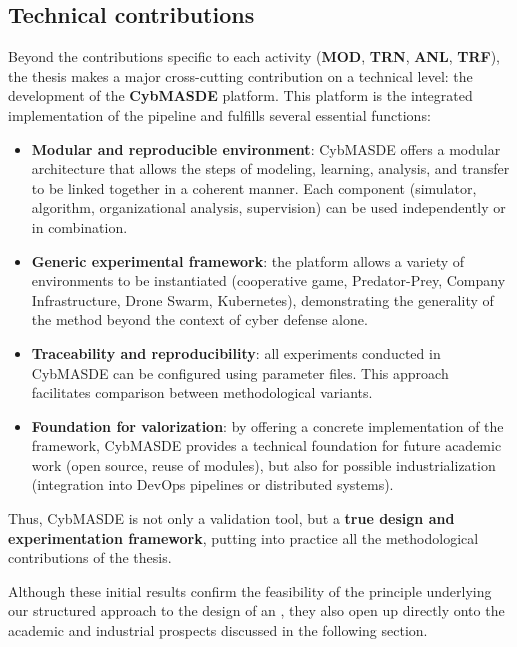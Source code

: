         \subsection*{Technical contributions}
        Beyond the contributions specific to each activity (\textbf{MOD}, \textbf{TRN}, \textbf{ANL}, \textbf{TRF}), the thesis makes a major cross-cutting contribution on a technical level: the development of the \textbf{CybMASDE} platform.
        This platform is the integrated implementation of the  pipeline and fulfills several essential functions:
        \begin{itemize}
          \item \textbf{Modular and reproducible environment}: CybMASDE offers a modular architecture that allows the steps of modeling, learning, analysis, and transfer to be linked together in a coherent manner. Each component (simulator,  algorithm, organizational analysis, supervision) can be used independently or in combination.
          \item \textbf{Generic experimental framework}: the platform allows a variety of environments to be instantiated (cooperative game, Predator-Prey, Company Infrastructure, Drone Swarm, Kubernetes), demonstrating the generality of the method beyond the context of cyber defense alone.
          \item \textbf{Traceability and reproducibility}: all experiments conducted in CybMASDE can be configured using parameter files. This approach facilitates comparison between methodological variants.

          \item \textbf{Foundation for valorization}: by offering a concrete implementation of the  framework, CybMASDE provides a technical foundation for future academic work (open source, reuse of modules), but also for possible industrialization (integration into DevOps pipelines or distributed systems).
        \end{itemize}
        Thus, CybMASDE is not only a validation tool, but a \textbf{true design and experimentation framework}, putting into practice all the methodological contributions of the thesis.

        \noindent
        Although these initial results confirm the feasibility of the principle underlying our structured approach to the design of an , they also open up directly onto the academic and industrial prospects discussed in the following section.
